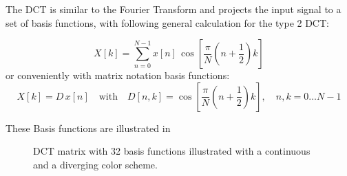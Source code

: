 The DCT is similar to the Fourier Transform and projects the input signal to a set of basis functions, with following general calculation for the type 2 DCT:

\begin{equation}\label{eq:signal_mfcc_dct}
  X[k] = \sum_{n=0}^{N-1} x[n] \, \cos{\left[ \frac{\pi}{N} \left( n + \frac{1}{2} \right) k  \right]}
\end{equation}
or conveniently with matrix notation basis functions:
\begin{equation}\label{eq:signal_mfcc_dct_matrix}
  X[k] = D \, x[n] \quad \mathrm{with} \quad D[n, k] = \cos{\left[ \frac{\pi}{N} \left( n + \frac{1}{2} \right) k  \right]}, \quad n, k = 0 \dots N - 1
\end{equation}

These Basis functions are illustrated in 
\begin{figure}[!ht]
  \centering
  \quad
  \caption{DCT matrix with 32 basis functions illustrated with a continuous and a diverging color scheme.}
  \label{fig:signal_mfcc_dct}
\end{figure}
\FloatBarrier
\noindent


